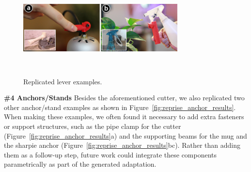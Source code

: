 
\begin{figure}[h!]
\vskip 5pt
  \centering
  \includegraphics[width=0.75\textwidth]{figures/reprise_lever_results_v1.pdf}
  \caption{Replicated lever examples.}~\label{fig:reprise_lever_results}
\end{figure}

\textbf{\#4 Anchors/Stands}
Besides the aforementioned cutter, we also replicated two other anchor/stand examples as shown in Figure~\ref{fig:reprise_anchor_results}. When making these examples, we often found it necessary to add extra fasteners or support structures, such as the pipe clamp for the cutter (Figure~\ref{fig:reprise_anchor_results}a) and the supporting beams for the mug and the sharpie anchor (Figure~\ref{fig:reprise_anchor_results}bc). Rather than adding them as a follow-up step, future work could integrate these components parametrically as part of the generated adaptation.


